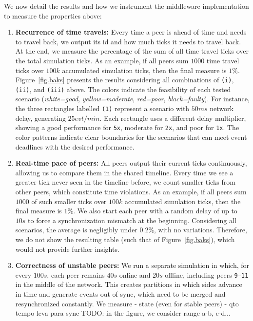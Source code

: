 \documentclass[10pt,journal,compsoc]{IEEEtran}
\newcommand{\code}[1]  {\texttt{\footnotesize{#1}}}
\begin{document}
We now detail the results and how we instrument the middleware implementation
to measure the properties above:
%
\begin{enumerate}
%
\item \textbf{Recurrence of time travels:}
Every time a peer is ahead of time and needs to travel back, we output its id
and how much ticks it needs to travel back.
At the end, we measure the percentage of the sum of all time travel ticks over
the total simulation ticks.
As an example, if all peers sum $1000$ time travel ticks over $100k$
accumulated simulation ticks, then the final measure is $1\%$.
%
Figure~\ref{fig.baks} presents the results considering all combinations of
\code{(i)}, \code{(ii)}, and \code{(iii)} above.
The colors indicate the feasibility of each tested scenario
    (\emph{white=good}, \emph{yellow=moderate}, \emph{red=poor},
    \emph{black=faulty}).
%
For instance, the three rectangles labelled \code{(1)} represent a scenario
with $50ms$ network delay, generating $25evt/min$.
Each rectangle uses a different delay multiplier, showing a good performance
for \code{5x}, moderate for \code{2x}, and poor for \code{1x}.
%
The color patterns indicate clear boundaries for the scenarios that can meet
event deadlines with the desired performance.
%
\item \textbf{Real-time pace of peers:}
All peers output their current ticks continuously, allowing us to compare them
in the shared timeline.
Every time we see a greater tick never seen in the timeline before, we count
smaller ticks from other peers, which constitute time violations.
As an example, if all peers sum $1000$ of such smaller ticks over $100k$
accumulated simulation ticks, then the final measure is $1\%$.
%
We also start each peer with a random delay of up to $10s$ to force a
synchronization mismatch at the beginning.
%
Considering all scenarios, the average is negligibly under $0.2\%$, with no
variations.
Therefore, we do not show the resulting table (such that of
Figure~\ref{fig.baks}), which would not provide further insights.
%
\item \textbf{Correctness of unstable peers:}
We run a separate simulation in which, for every $100s$, each peer remains
$40s$ online and $20s$ offline, including peers \code{9--11} in the middle of
the network.
This creates partitions in which sides advance in time and generate events out
of sync, which need to be merged and resynchronized constantly.
We measure
    - state (even for stable peers)
    - qto tempo leva para sync
TODO: in the figure, we consider range a-b, c-d...
%
\end{enumerate}
\end{document}
